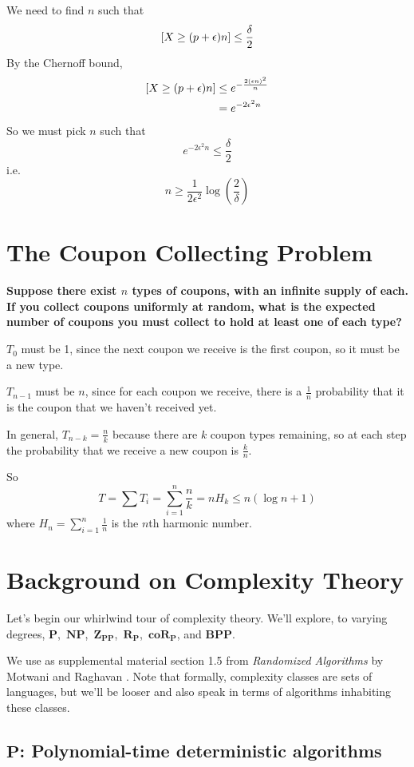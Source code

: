 \documentclass[11pt]{article}
\let\Pr\relax
\DeclareMathOperator*{\Pr}{\mathbb{P}}
\newcommand{\eps}{\epsilon}
\newcommand{\Pt}{\ensuremath{\mathbf{P}}}
\newcommand{\NP}{\ensuremath{\mathbf{NP}}}
\newcommand{\BPP}{\ensuremath{\mathbf{BPP}}}
\newcommand{\ZPP}{\ensuremath{\mathbf{Z_{PP}}}}
\newcommand{\RP}{\ensuremath{\mathbf{R_{P}}}}
\newcommand{\coRP}{\ensuremath{\mathbf{coR_{P}}}}
\let\ab\allowbreak
\begin{document}
We need to find $n$ such that
$$ \Pr[X \ge (p + \eps)n] \le \frac{\delta}{2} $$
By the Chernoff bound,
\begin{align*}
  \Pr[X \ge (p + \eps)n] &\le e^{-\frac{2(\eps n)^2}{n}} \\
                         &= e^{-2\eps^2 n}
\end{align*}
So we must pick $n$ such that
$$ e^{-2\eps^2 n} \le \frac \delta 2 $$
i.e.
$$ n \ge \frac{1}{2\eps^2}\log\left(\frac{2}{\delta} \right) $$

\section{The Coupon Collecting Problem}

\textbf{Suppose there exist $n$ types of coupons, with an infinite supply of each. If you collect coupons uniformly at random, what is the expected number of coupons you must collect to hold at least one of each type?}



$T_0$ must be 1, since the next coupon we receive is the first coupon, so it must be a new type.

$T_{n-1}$ must be $n$, since for each coupon we receive, there is a $\frac{1}{n}$ probability that it is the coupon that we haven't received yet.

In general, $T_{n-k} = \frac n k$ because there are $k$ coupon types remaining, so at each step the probability that we receive a new coupon is $\frac{k}{n}$.

So
$$ T = \sum{T_i} = \sum_{i=1}^n \frac{n}{k} = nH_k \leq n(\log n + 1) $$
where $H_n = \sum_{i=1}^n \frac{1}{n}$ is the $n$th harmonic number.

\section{Background on Complexity Theory}

Let's begin our whirlwind tour of complexity theory. We'll explore, to varying degrees, \Pt,\ \NP,\ab\ \ZPP,\ \RP,\ \coRP, and \BPP.

We use as supplemental material section 1.5 from \textit{Randomized Algorithms} by Motwani and Raghavan \cite{MR}.
Note that formally, complexity classes are sets of languages, but we'll be looser and also speak in terms of algorithms inhabiting these classes.

\subsection{\Pt: Polynomial-time deterministic algorithms}
\end{document}
